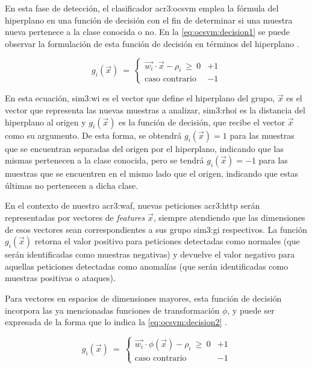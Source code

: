 En esta fase de detección, el clasificador \gls{acr3:ocsvm} emplea la
fórmula del hiperplano en una función de decisión con el fin de determinar
si una muestra nueva pertenece a la clase conocida o no. En la
\autoref{eq:ocsvm:decision1} se puede observar la formulación de esta
función de decisión en términos del hiperplano
\citep{amer2013paper}. %

\begin{equation}
    \label{eq:ocsvm:decision1}
    g_{i}(\vec{x})
    \ = \
    \begin{cases}
        \vec{w_{i}} \cdot \vec{x} - \rho_{i} \ \geqslant \ 0    & +1 \\
        \text{caso contrario}                                   & -1
    \end{cases}
\end{equation}

En esta ecuación, \gls{sim3:wi} es el vector que define el hiperplano
del grupo, $\vec{x}$ es el vector que representa las nuevas muestras a
analizar, \gls{sim3:rhoi} es la distancia del hiperplano al origen y
$g_{i}(\vec{x})$ es la función de decisión, que recibe el vector $\vec{x}$
como su argumento.
De esta forma, se obtendrá $g_{i}(\vec{x}) = 1$ para las muestras que se
encuentran separadas del origen por el hiperplano, indicando que las mismas
pertenecen a la clase conocida, pero se tendrá $g_{i}(\vec{x}) = -1$ para
las muestras que se encuentren en el mismo lado que el origen, indicando
que estas últimas no pertenecen a dicha clase.

En el contexto de nuestro \gls{acr3:waf}, nuevas peticiones \gls{acr3:http}
serán representadas por vectores de \textit{features} $\vec{x}$, siempre
atendiendo que las dimensiones de esos vectores sean correspondientes a
sus grupo \gls{sim3:gi} respectivos.
La función $g_{i}(\vec{x})$ retorna el valor positivo para peticiones
detectadas como normales (que serán identificadas como muestras negativas)
y devuelve el valor negativo para aquellas peticiones detectadas como
anomalías (que serán identificadas como muestras positivas o ataques).

Para vectores en espacios de dimensiones mayores, esta función de decisión
incorpora las ya mencionadas funciones de transformación $\phi$, y puede
ser expresada de la forma que lo indica la \autoref{eq:ocsvm:decision2}
\citep{amer2013paper}. %

\begin{equation}
    \label{eq:ocsvm:decision2}
    g_{i}(\vec{x})
    \ = \
    \begin{cases}
        \vec{w_{i}} \cdot \phi(\vec{x}) - \rho_{i} \ \geqslant \ 0  & +1 \\
        \text{caso contrario}                                       & -1
    \end{cases}
\end{equation}

